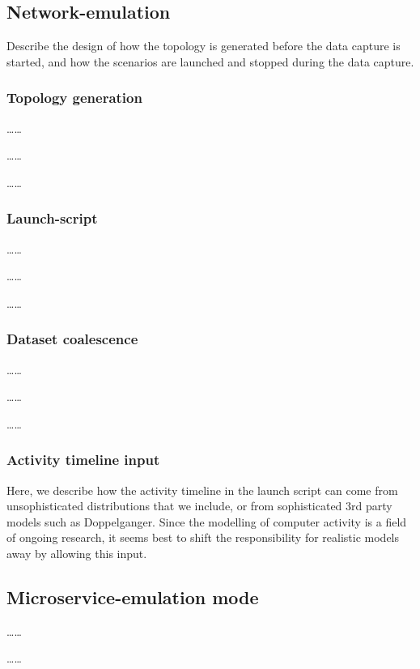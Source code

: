 \documentclass{article}
\begin{document}


\subsection{Network-emulation}

Describe the design of how the topology is generated before the data capture is started, and how the scenarios are launched and stopped during the data capture.
\subsubsection{Topology generation}
\dots \dots

\dots \dots

\dots \dots
\subsubsection{Launch-script}

\dots \dots

\dots \dots

\dots \dots

\subsubsection{Dataset coalescence}\label{Sec:datasetcreation}
\dots \dots

\dots \dots

\dots \dots
\subsubsection{Activity timeline input}
Here, we describe how the activity timeline in the launch script can come from unsophisticated distributions that we include, or from sophisticated 3rd party models such as Doppelganger. Since the modelling of computer activity is a field of ongoing research, it seems best to shift the responsibility for realistic models away by allowing this input. 

\subsection{Microservice-emulation mode}

\dots \dots

\dots \dots
\end{document}
